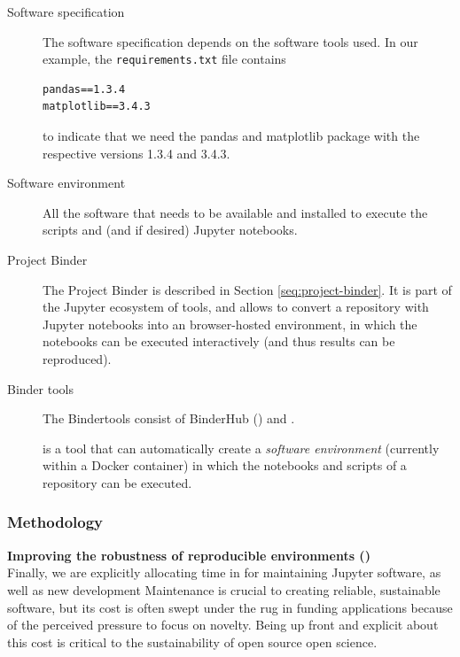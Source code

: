 \begin{description}
\item[Software specification] The software specification depends on the software
  tools used. In our example, the \texttt{requirements.txt} file contains
\begin{verbatim}
pandas==1.3.4
matplotlib==3.4.3
\end{verbatim}
to indicate that we need the pandas and matplotlib package with the respective
versions 1.3.4 and 3.4.3.

\item[Software environment] All the software that needs to be available and
  installed to execute the scripts and (and if desired) Jupyter notebooks.

\item[Project Binder] The Project Binder is described in Section
\ref{seq:project-binder}. It is part of the Jupyter ecosystem of tools, and
allows to convert a repository with Jupyter notebooks into an browser-hosted
environment, in which the notebooks can be executed interactively (and thus
results can be reproduced). 

\item[Binder tools] The Bindertools consist of BinderHub () and
\repotodocker{}. 

\item[\repotodocker] \repotodocker{} is a tool that can automatically create a
\emph{software environment} (currently within a Docker container) in which the
notebooks and scripts of a repository can be executed. 
\end{description}




% 

\subsubsection{Methodology}\label{sec:methodology}

\textbf{Improving the robustness of reproducible environments ()}\\
Finally, we are explicitly allocating time in  for maintaining
Jupyter software, as well as new development
Maintenance is crucial to creating reliable, sustainable software,
but its cost is often swept under the rug in funding applications
because of the perceived pressure to focus on novelty.
Being up front and explicit about this cost is critical to the sustainability
of open source open science.

